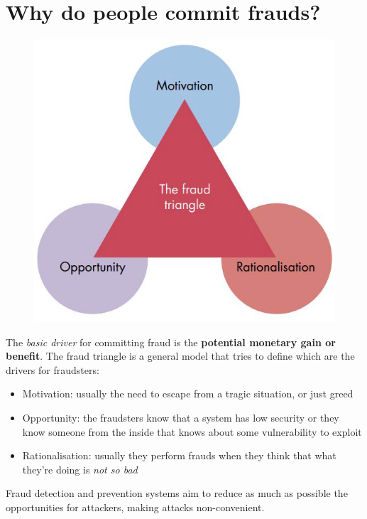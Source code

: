 \section{Why do people commit frauds?}
    \begin{figure}[!ht]
        \centering
        \includegraphics[width=0.45\linewidth]{triangle.png}
    \end{figure}
    The \textit{basic driver} for committing fraud is the \textbf{potential monetary gain or benefit}. The fraud triangle is a general model that tries to define which are the drivers for fraudsters:
    \begin{itemize}
        \item Motivation: usually the need to escape from a tragic situation, or just greed 
        \item Opportunity: the fraudsters know that a system has low security or they know someone from the inside that knows about some vulnerability to exploit 
        \item Rationalisation: usually they perform frauds when they think that what they're doing is \textit{not so bad}
    \end{itemize}
    Fraud detection and prevention systems aim to reduce as much as possible the opportunities for attackers, making attacks non-convenient.
